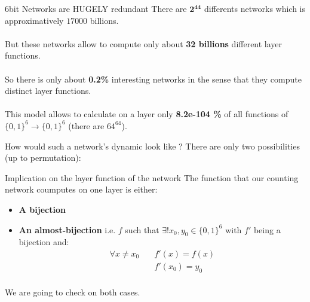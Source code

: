 \documentclass{beamer}
\begin{document}
\begin{frame}{6bit Networks are HUGELY redundant}
	There are $\boldsymbol{2^{44}}$ differents networks which is approximatively $17 000$ billions. \\ \ \\
	
	But these networks allow to compute only about \textbf{32 billions} different layer functions. \\ \ \\
	So there is only about \textbf{0.2\%} interesting networks in the sense that they compute distinct layer functions. \\ \ \\
	This model allows to calculate on a layer only \textbf{8.2e-104 \%} of all functions of $\{0,1\}^6 \rightarrow \{0,1\}^6$ (there are $64^{64}$).
\end{frame} 


\begin{frame}{How would such a network's dynamic look like ?} 
	There are only two possibilities (up to permutation):
	
	\centering{}\medskip\pause
	
	\centering{}
\end{frame}

\begin{frame}{Implication on the layer function of the network} 
	The function that our counting network coumputes on one layer is either:
	\begin{itemize}
		\item \textbf{A bijection}
		\item \textbf{An almost-bijection}\pause{} i.e. $f$ such that $\exists ! x_0,y_0 \in \{0,1\}^6$ with $f'$ being a bijection and:  
		\begin{align*}
			\forall x \neq x_0 \quad & f'(x) = f(x)  \\
								     & f'(x_0) = y_0 \\
		\end{align*}
	\end{itemize}\pause
	We are going to check on both cases.
\end{frame}
\end{document}
